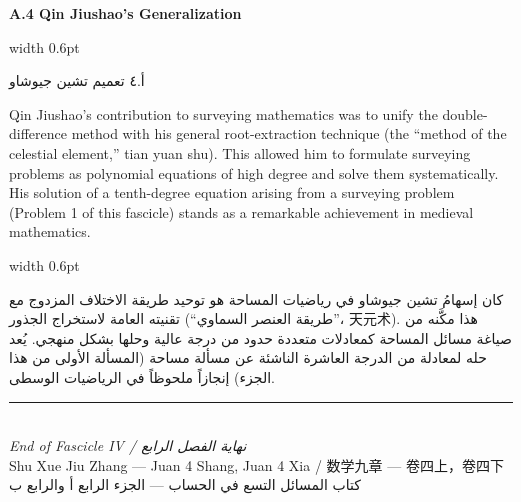 \documentclass[11pt,a4paper]{article}
\newlength{\cnwidth}
\newlength{\arwidth}
\newcommand{\paralleltext}[2]{%
  \par\medskip\noindent
  \begin{minipage}[t]{\cnwidth}%
    \small #1%
  \end{minipage}%
  \hfill\textcolor{colrule}{\vrule width 0.6pt}\hfill
  \begin{minipage}[t]{\arwidth}%
    \small\arabicfont\beginR #2\endR%
  \end{minipage}%
  \par\medskip
}
\newcommand{\parallelsubsection}[2]{%
  \par\medskip\noindent
  \begin{minipage}[t]{\cnwidth}%
    \large\bfseries\color{sectioncolor} #1%
  \end{minipage}%
  \hfill\textcolor{colrule}{\vrule width 0.6pt}\hfill
  \begin{minipage}[t]{\arwidth}%
    \large\arabicfontbf\color{sectioncolor}\beginR #2\endR%
  \end{minipage}%
  \par\smallskip
}
\begin{document}
\parallelsubsection{A.4 Qin Jiushao's Generalization}{أ.٤ تعميم تشين جيوشاو}

\paralleltext{%
Qin Jiushao's contribution to surveying mathematics was to unify the double-difference method with his general root-extraction technique (the ``method of the celestial element,'' tian yuan shu). This allowed him to formulate surveying problems as polynomial equations of high degree and solve them systematically. His solution of a tenth-degree equation arising from a surveying problem (Problem 1 of this fascicle) stands as a remarkable achievement in medieval mathematics.
}{%
كان إسهامُ تشين جيوشاو في رياضيات المساحة هو توحيد طريقة الاختلاف المزدوج مع تقنيته العامة لاستخراج الجذور (``طريقة العنصر السماوي''، 天元术). هذا مكَّنه من صياغة مسائل المساحة كمعادلات متعددة حدود من درجة عالية وحلها بشكل منهجي. يُعد حله لمعادلة من الدرجة العاشرة الناشئة عن مسألة مساحة (المسألة الأولى من هذا الجزء) إنجازاً ملحوظاً في الرياضيات الوسطى.
}

\vspace{1.5cm}

\begin{center}
\textcolor{colrule}{\rule{8cm}{0.6pt}}\\[0.5cm]
{\small\textit{End of Fascicle IV / نهاية الفصل الرابع}}\\[0.3cm]
{\small Shu Xue Jiu Zhang — Juan 4 Shang, Juan 4 Xia / 数学九章 — 卷四上，卷四下}\\[0.3cm]
{\small\arabicfont\beginR كتاب المسائل التسع في الحساب — الجزء الرابع أ والرابع ب\endR}
\end{center}
\end{document}
